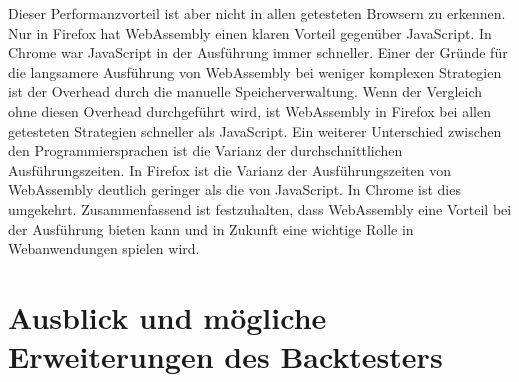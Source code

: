 Dieser Performanzvorteil ist aber nicht in allen getesteten Browsern zu erkennen.
Nur in Firefox hat WebAssembly einen klaren Vorteil gegenüber JavaScript.
In Chrome war JavaScript in der Ausführung immer schneller.
Einer der Gründe für die langsamere Ausführung von WebAssembly bei weniger komplexen Strategien ist der Overhead durch die manuelle Speicherverwaltung.
Wenn der Vergleich ohne diesen Overhead durchgeführt wird, ist WebAssembly in Firefox bei allen getesteten Strategien schneller als JavaScript.
Ein weiterer Unterschied zwischen den Programmiersprachen ist die Varianz der durchschnittlichen Ausführungszeiten.
In Firefox ist die Varianz der Ausführungszeiten von WebAssembly deutlich geringer als die von JavaScript.
In Chrome ist dies umgekehrt.
\newline
Zusammenfassend ist festzuhalten, dass WebAssembly eine Vorteil bei der Ausführung bieten kann und in Zukunft eine wichtige Rolle in Webanwendungen spielen wird.

\section{Ausblick und mögliche Erweiterungen des Backtesters}
\label{sec:AusblickundmöglicheErweiterungendesBacktesters}

